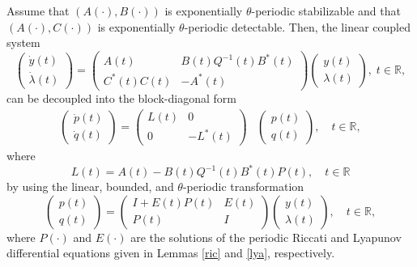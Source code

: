 \documentclass{IEEEtran}
\begin{document}
	\begin{theorem}\label{dudic}
		Assume that $(A(\cdot),B(\cdot))$ is exponentially $\theta$-periodic stabilizable and that $(A(\cdot),C(\cdot))$ is exponentially $\theta$-periodic detectable. Then, the linear coupled system
		\begin{equation*}
			\begin{pmatrix}
				\dot{y}(t)\\\dot{\lambda}(t)
			\end{pmatrix}=
			\begin{pmatrix}
				A(t) & B(t)Q^{-1}(t)B^*(t)\\C^*(t)C(t)&-A^*(t)
			\end{pmatrix}\begin{pmatrix}
				y(t)\\ \lambda (t)
			\end{pmatrix},\; t\in\mathbb R,
		\end{equation*}
		can be decoupled into the block-diagonal form
		\begin{equation*}
			\begin{split}
				\begin{pmatrix}\dot{p}(t)\\ \dot{q}(t)\end{pmatrix}
				=
				\begin{pmatrix}
					L(t) & 0 \\
					0 & -L^*(t)
				\end{pmatrix}
				&
				\begin{pmatrix}p(t)\\ q(t)\end{pmatrix},\quad t\in\mathbb{R},
			\end{split}
		\end{equation*}
		where
		\begin{equation}\label{eq:A-BQ-1B*P}
			L(t)=A(t)-B(t)Q^{-1}(t)B^*(t)P(t),\quad t\in\mathbb{R}
		\end{equation}
		by using the linear, bounded, and $\theta$-periodic transformation
		\begin{equation}\label{ducan1}
			\begin{pmatrix}
				p(t)\\ q (t)
			\end{pmatrix}=
			\begin{pmatrix}
				I+E(t)P(t)&E(t)\\P(t)&I
			\end{pmatrix}
			\begin{pmatrix}
				y(t)\\  \lambda (t)
			\end{pmatrix},\quad t\in\mathbb R,
		\end{equation}
		where $P(\cdot)$ and $E(\cdot)$ are the solutions of the periodic Riccati and Lyapunov differential equations given in Lemmas \ref{ric} and \ref{lya}, respectively.
	\end{theorem}
	
\end{document}
